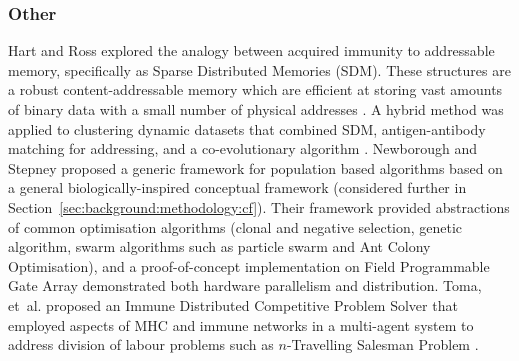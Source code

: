 %
%
\subsubsection{Other}
Hart and Ross explored the analogy between acquired immunity to addressable memory, specifically as Sparse Distributed Memories (SDM). These structures are a robust content-addressable memory which are efficient at storing vast amounts of binary data with a small number of physical addresses \cite{Smith1996}. A hybrid method was applied to clustering dynamic datasets that combined SDM, antigen-antibody matching for addressing, and a co-evolutionary algorithm \cite{Hart2001, Hart2003a}.
Newborough and Stepney proposed a generic framework for population based algorithms based on a general biologically-inspired conceptual framework \cite{Newborough2005} (considered further in Section~\ref{sec:background:methodology:cf}). Their framework provided abstractions of common optimisation algorithms (clonal and negative selection, genetic algorithm, swarm algorithms such as particle swarm and Ant Colony Optimisation), and a proof-of-concept implementation on Field Programmable Gate Array demonstrated both hardware parallelism and distribution.
Toma, et~al. proposed an Immune Distributed Competitive Problem Solver that employed aspects of MHC and immune networks in a multi-agent system to address division of labour problems such as $n$-Travelling Salesman Problem \cite{Toma2000}.

%
%

